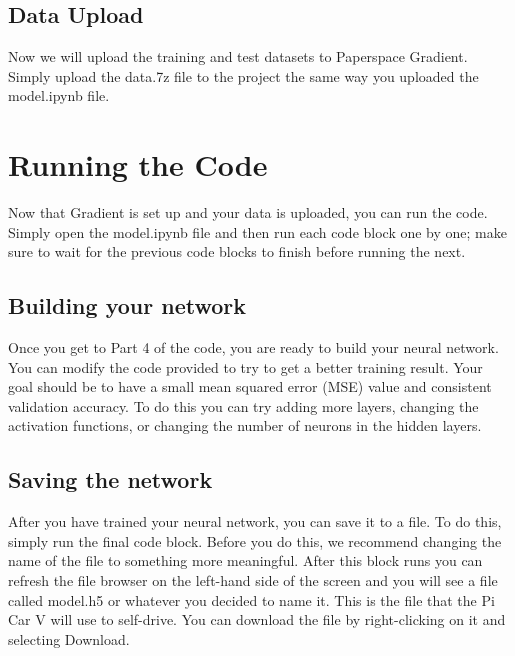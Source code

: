 \documentclass[11pt]{report}
\begin{document}
\section{Data Upload}
Now we will upload the training and test datasets to Paperspace Gradient. Simply upload the data.7z file to the project the same way you uploaded the model.ipynb file.

\chapter{Running the Code}
Now that Gradient is set up and your data is uploaded, you can run the code. Simply open the model.ipynb file and then run each code block one by one; make sure to wait for the previous code blocks to finish before running the next.

\section{Building your network}
Once you get to Part 4 of the code, you are ready to build your neural network. You can modify the code provided to try to get a better training result. Your goal should be to have a small mean squared error (MSE) value and consistent validation accuracy. To do this you can try adding more layers, changing the activation functions, or changing the number of neurons in the hidden layers.

\section{Saving the network}
After you have trained your neural network, you can save it to a file. To do this, simply run the final code block. Before you do this, we recommend changing the name of the file to something more meaningful. After this block runs you can refresh the file browser on the left-hand side of the screen and you will see a file called model.h5 or whatever you decided to name it. This is the file that the Pi Car V will use to self-drive. You can download the file by right-clicking on it and selecting Download. 

\pagebreak
\end{document}
